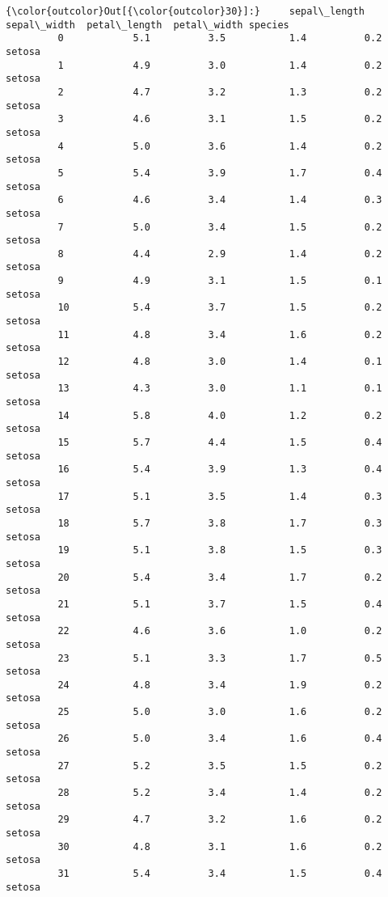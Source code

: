 \documentclass[11pt]{article}
\begin{document}
\begin{Verbatim}[commandchars=\\\{\}]
{\color{outcolor}Out[{\color{outcolor}30}]:}     sepal\_length  sepal\_width  petal\_length  petal\_width species
         0            5.1          3.5           1.4          0.2  setosa
         1            4.9          3.0           1.4          0.2  setosa
         2            4.7          3.2           1.3          0.2  setosa
         3            4.6          3.1           1.5          0.2  setosa
         4            5.0          3.6           1.4          0.2  setosa
         5            5.4          3.9           1.7          0.4  setosa
         6            4.6          3.4           1.4          0.3  setosa
         7            5.0          3.4           1.5          0.2  setosa
         8            4.4          2.9           1.4          0.2  setosa
         9            4.9          3.1           1.5          0.1  setosa
         10           5.4          3.7           1.5          0.2  setosa
         11           4.8          3.4           1.6          0.2  setosa
         12           4.8          3.0           1.4          0.1  setosa
         13           4.3          3.0           1.1          0.1  setosa
         14           5.8          4.0           1.2          0.2  setosa
         15           5.7          4.4           1.5          0.4  setosa
         16           5.4          3.9           1.3          0.4  setosa
         17           5.1          3.5           1.4          0.3  setosa
         18           5.7          3.8           1.7          0.3  setosa
         19           5.1          3.8           1.5          0.3  setosa
         20           5.4          3.4           1.7          0.2  setosa
         21           5.1          3.7           1.5          0.4  setosa
         22           4.6          3.6           1.0          0.2  setosa
         23           5.1          3.3           1.7          0.5  setosa
         24           4.8          3.4           1.9          0.2  setosa
         25           5.0          3.0           1.6          0.2  setosa
         26           5.0          3.4           1.6          0.4  setosa
         27           5.2          3.5           1.5          0.2  setosa
         28           5.2          3.4           1.4          0.2  setosa
         29           4.7          3.2           1.6          0.2  setosa
         30           4.8          3.1           1.6          0.2  setosa
         31           5.4          3.4           1.5          0.4  setosa

\end{Verbatim}
\end{document}
